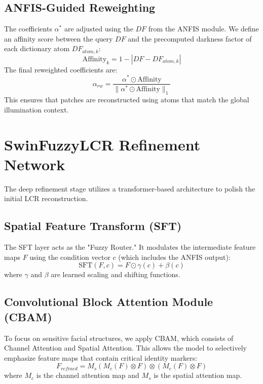 \subsection{ANFIS-Guided Reweighting}
The coefficients $\alpha^*$ are adjusted using the $DF$ from the ANFIS module. We define an affinity score between the query $DF$ and the precomputed darkness factor of each dictionary atom $DF_{atom, k}$:
\begin{equation}
    \text{Affinity}_k = 1 - |DF - DF_{atom, k}|
\end{equation}
The final reweighted coefficients are:
\begin{equation}
    \alpha_{rw} = \frac{\alpha^* \odot \text{Affinity}}{\|\alpha^* \odot \text{Affinity}\|_1}
\end{equation}
This ensures that patches are reconstructed using atoms that match the global illumination context.

\section{SwinFuzzyLCR Refinement Network}
The deep refinement stage utilizes a transformer-based architecture to polish the initial LCR reconstruction.

\subsection{Spatial Feature Transform (SFT)}
The SFT layer acts as the "Fuzzy Router." It modulates the intermediate feature maps $F$ using the condition vector $c$ (which includes the ANFIS output):
\begin{equation}
    \text{SFT}(F, c) = F \odot \gamma(c) + \beta(c)
\end{equation}
where $\gamma$ and $\beta$ are learned scaling and shifting functions.

\subsection{Convolutional Block Attention Module (CBAM)}
To focus on sensitive facial structures, we apply CBAM, which consists of Channel Attention and Spatial Attention. This allows the model to selectively emphasize feature maps that contain critical identity markers:
\begin{equation}
    F_{refined} = M_s(M_c(F) \otimes F) \otimes (M_c(F) \otimes F)
\end{equation}
where $M_c$ is the channel attention map and $M_s$ is the spatial attention map. 


